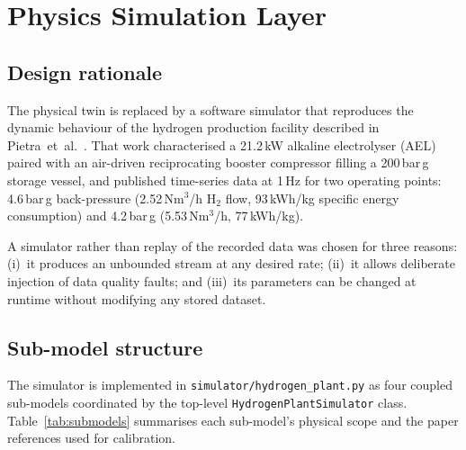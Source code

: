 \section{Physics Simulation Layer}
\label{sec:simulator}

\subsection{Design rationale}
\label{subsec:sim-rationale}

The physical twin is replaced by a software simulator that reproduces the
dynamic behaviour of the hydrogen production facility described in
Pietra~et~al.~\cite{pietra2021}.
That work characterised a 21.2\,kW alkaline electrolyser (AEL) paired with
an air-driven reciprocating booster compressor filling a 200\,bar\,g
storage vessel, and published time-series data at 1\,Hz for two operating
points: 4.6\,bar\,g back-pressure (2.52\,Nm$^3$/h H$_2$ flow,
93\,kWh/kg specific energy consumption) and 4.2\,bar\,g
(5.53\,Nm$^3$/h, 77\,kWh/kg).

A simulator rather than replay of the recorded data was chosen for three
reasons: (i)~it produces an unbounded stream at any desired rate;
(ii)~it allows deliberate injection of data quality faults; and
(iii)~its parameters can be changed at runtime without modifying any stored
dataset.

\subsection{Sub-model structure}
\label{subsec:sim-structure}

The simulator is implemented in \texttt{simulator/hydrogen\_plant.py} as
four coupled sub-models coordinated by the top-level
\texttt{HydrogenPlantSimulator} class.
Table~\ref{tab:submodels} summarises each sub-model's physical scope and
the paper references used for calibration.

